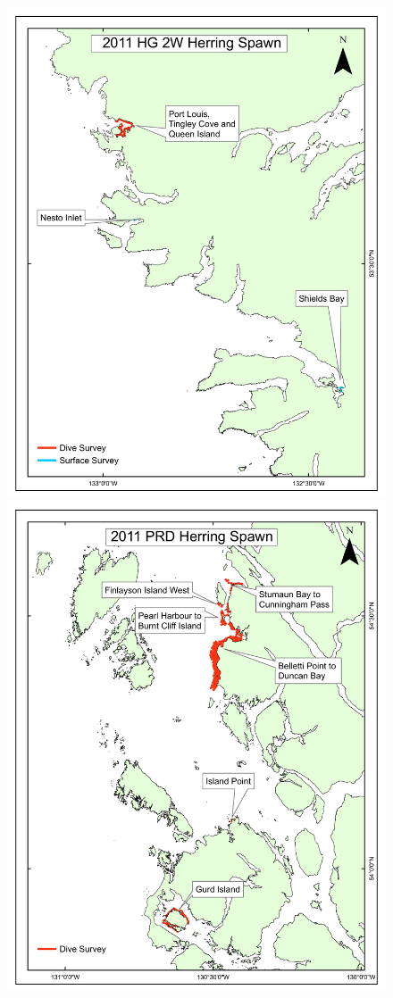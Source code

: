 \begin{figure}[!tbp]
	\includegraphics[scale=0.35]{../Figs/PBSfigs/2011_spawn_HG_2W_July13.pdf}\\
	\includegraphics[scale=0.35]{../Figs/PBSfigs/2011_spawn_PRD_July13.pdf}

\end{figure}
